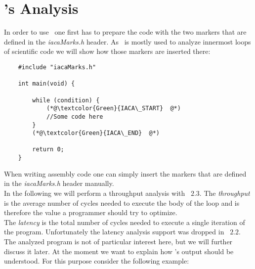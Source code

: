 \section{\iaca's Analysis} 

In order to use \iaca\ one first has to prepare the code with the two markers that are defined in the \emph{iacaMarks.h} header. As \iaca\ is mostly used to analyze innermost loops of scientific code we will show how those markers are inserted there:

\begin{mdframed}[backgroundcolor=light-gray, roundcorner=10pt,leftmargin=1, rightmargin=1, innerleftmargin=15, innertopmargin=1,innerbottommargin=1, outerlinewidth=1, linecolor=light-gray]
    \begin{lstlisting}
    #include "iacaMarks.h"
    
    int main(void) {
    
        while (condition) {
            (*@\textcolor{Green}{IACA\_START}  @*)
            //Some code here
        }
        (*@\textcolor{Green}{IACA\_END}  @*)
    
        return 0;
    }
    \end{lstlisting}
\end{mdframed}

When writing assembly code one can simply insert the markers that are defined in the \emph{iacaMarks.h} header manually.\\
In the following we will perform a throughput analysis with \iaca\ $2.3$. The \emph{throughput} is the average number of cycles needed to execute the body of the loop and is therefore the value a programmer should try to optimize.\\ 
The \emph{latency} is the total number of cycles needed to execute a single iteration of the program. Unfortunately the latency analysis support was dropped in \iaca\ $2.2$.\\
The analyzed program is not of particular interest here, but we will further discuss it later.  At the moment we want to explain how \iaca's output should be understood. For this purpose consider the following example:

